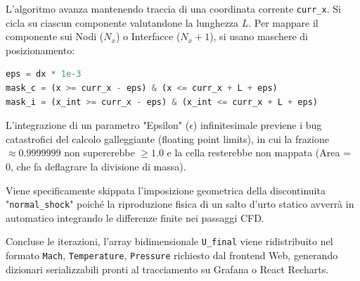\documentclass[11pt,a4paper]{article}
\begin{document}
L'algoritmo avanza mantenendo traccia di una coordinata corrente \texttt{curr\_x}. Si cicla su ciascun componente valutandone la lunghezza $L$.
Per mappare il componente sui Nodi ($N_x$) o Interfacce ($N_x + 1$), si usano maschere di posizionamento:
\begin{lstlisting}[language=Python]
eps = dx * 1e-3
mask_c = (x >= curr_x - eps) & (x <= curr_x + L + eps)
mask_i = (x_int >= curr_x - eps) & (x_int <= curr_x + L + eps)
\end{lstlisting}
L'integrazione di un parametro "Epsilon" ($\epsilon$) infinitesimale previene i bug catastrofici del calcolo galleggiante (floating point limits), in cui la frazione $\approx 0.9999999$ non supererebbe $\geq 1.0$ e la cella resterebbe non mappata (Area = 0, che fa deflagrare la divisione di massa).

Viene specificamente skippata l'imposizione geometrica della discontinuita "\texttt{normal\_shock}" poiché la riproduzione fisica di un salto d'urto statico avverrà in automatico integrando le differenze finite nei passaggi CFD.

Concluse le iterazioni, l'array bidimensionale \texttt{U\_final} viene ridistribuito nel formato \texttt{Mach}, \texttt{Temperature}, \texttt{Pressure} richiesto dal frontend Web, generando dizionari serializzabili pronti al tracciamento su Grafana o React Recharts.
\end{document}
